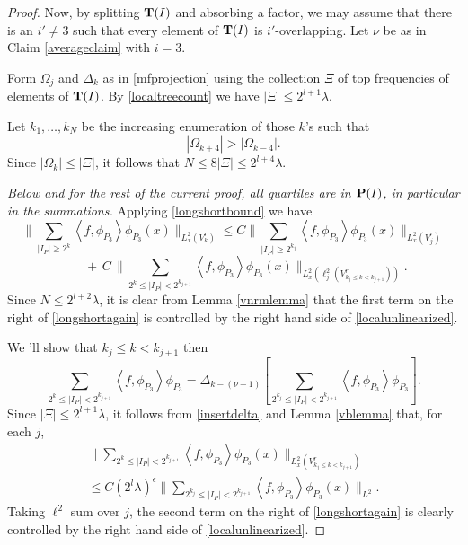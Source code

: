 \documentclass[12pt]{amsart}
\numberwithin{equation}{section}
\def\P{{\bf P}}
\def\T{{\bf T}}
\def\<{\left<}
\def\>{\right>}
\begin{document}
\begin{proof}
Now, by splitting $\T(I)$ and absorbing a factor, we may assume that there is an $i' \ne 3$ such that every element of $\T(I)$ is $i'$-overlapping. Let $\nu$ be as in Claim \ref{averageclaim} with $i=3$. 

Form $\Omega_j$ and $\Delta_k$ as in \eqref{mfprojection} using the collection $\Xi$ of top frequencies of elements of $\T(I)$. By \eqref{localtreecount} we have
$|\Xi| \leq 2^{l+1}\lambda$.

Let $k_1, \ldots, k_N$ be the increasing enumeration of those $k$'s such that 
$$|\Omega_{k+4}| > |\Omega_{k-4}|.$$
Since $|\Omega_k|\le |\Xi|$, it follows that $N \leq 8|\Xi|\le 2^{l+4}\lambda$. 

\emph{Below and for the rest of the current proof, all quartiles are in $\P(I)$, in particular in the summations.} Applying \eqref{longshortbound} we have
$$\|\sum_{|I_P| \geq 2^k} \<f,\phi_{P_3}\>\phi_{P_3}(x)\|_{L^2_x(V^r_k)} \leq C \|\sum_{|I_P| \geq 2^{k_j}} \<f,\phi_{P_3}\>\phi_{P_3}(x)\|_{L^2_x(V^r_j)}$$
\begin{equation} \label{longshortagain}
 \qquad + \, C\, \|\sum_{2^k  \leq |I_P| < 2^{k_{j+1}}} \<f,\phi_{P_3}\>\phi_{P_3}(x)\|_{L^2_x(\ell^2_j(V^r_{k_{j} \leq k < k_{j+1}}))}.
 \end{equation}
Since $N \le 2^{l+2}\lambda$, it is clear from Lemma \ref{vnrmlemma} that the first term on the right of \eqref{longshortagain} is controlled by the right hand side of \eqref{localunlinearized}. 

We 'll show that $k_j \leq k < k_{j+1}$ then
\begin{equation}\label{insertdelta}
\sum_{ 2^k  \leq |I_P| < 2^{k_{j+1}}} \<f,\phi_{P_3}\>\phi_{P_3} = \Delta_{k-(\nu + 1)}[\sum_{2^{k_{j}} \leq |I_P| < 2^{k_{j+1}}} \<f,\phi_{P_3}\>\phi_{P_3}].
\end{equation}
Since $|\Xi|\le 2^{l+1}\lambda$, it follows from \eqref{insertdelta} and Lemma \ref{vblemma} that, for each $j$,
\begin{eqnarray*}
\|\sum_{ 2^k  \leq |I_P| < 2^{k_{j+1}}} \<f,\phi_{P_3}\>\phi_{P_3}(x)\|_{L^2_x(V^r_{k_{j} \leq k < k_{j+1}})} 
 \\ 
\leq C  (2^l \lambda)^{\epsilon} \|\sum_{2^{k_j} \leq |I_P| < 2^{k_{j+1}}} \<f,\phi_{P_3}\>\phi_{P_3}(x)\|_{L^2}. 
\end{eqnarray*}
Taking $\ell^2$ sum over $j$, the second term on the right of \eqref{longshortagain} is clearly controlled by the right hand side of \eqref{localunlinearized}.


\end{proof}
\end{document}

